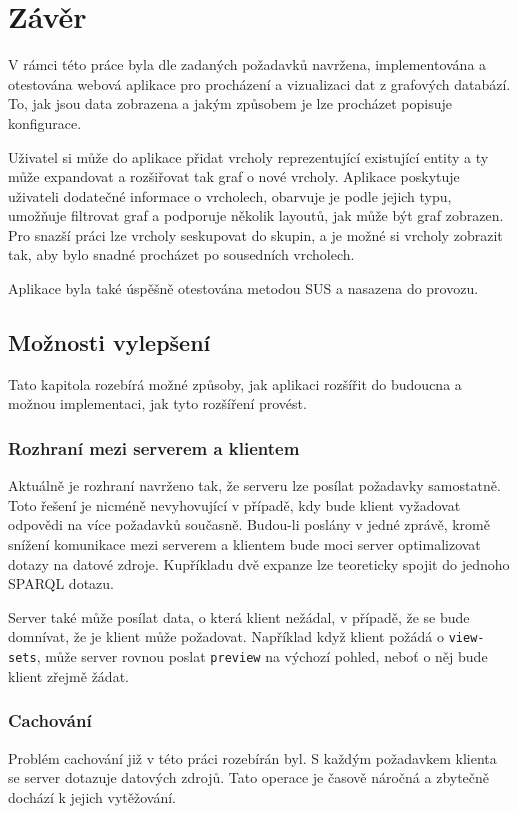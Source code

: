 \chapter*{Závěr}
V rámci této práce byla dle zadaných požadavků navržena, implementována a otestována webová aplikace pro procházení a vizualizaci dat z grafových databází. To, jak jsou data zobrazena a jakým způsobem je lze procházet popisuje konfigurace.

Uživatel si může do aplikace přidat vrcholy reprezentující existující entity a ty může expandovat a rozšiřovat tak graf o nové vrcholy. Aplikace poskytuje uživateli dodatečné informace o vrcholech, obarvuje je podle jejich typu, umožňuje filtrovat graf a podporuje několik layoutů, jak může být graf zobrazen. Pro snazší práci lze vrcholy seskupovat do skupin, a je možné si vrcholy zobrazit tak, aby bylo snadné procházet po sousedních vrcholech.

Aplikace byla také úspěšně otestována metodou SUS a nasazena do provozu.

\section{Možnosti vylepšení}
Tato kapitola rozebírá možné způsoby, jak aplikaci rozšířit do budoucna a možnou implementaci, jak tyto rozšíření provést.

\subsection*{Rozhraní mezi serverem a klientem}
Aktuálně je rozhraní navrženo tak, že serveru lze posílat požadavky samostatně. Toto řešení je nicméně nevyhovující v případě, kdy bude klient vyžadovat odpovědi na více požadavků současně. Budou-li poslány v jedné zprávě, kromě snížení komunikace mezi serverem a klientem bude moci server optimalizovat dotazy na datové zdroje. Kupříkladu dvě expanze lze teoreticky spojit do jednoho SPARQL dotazu.

Server také může posílat data, o která klient nežádal, v případě, že se bude domnívat, že je klient může požadovat. Například když klient požádá o \texttt{view-sets}, může server rovnou poslat \texttt{preview} na výchozí pohled, neboť o něj bude klient zřejmě žádat.

\subsection*{Cachování}
Problém cachování již v této práci rozebírán byl. S každým požadavkem klienta se server dotazuje datových zdrojů. Tato operace je časově náročná a zbytečně dochází k jejich vytěžování.


